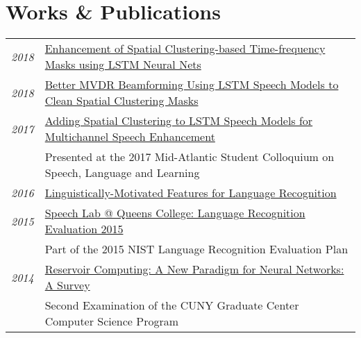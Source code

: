 \documentclass[a4paper,10pt]{article}
\begin{document}
\section{Works \& Publications}
    \vspace{0.2cm}
    \begin{tabular}{rp{14cm}}
        \hspace{2.5cm}\emph{2018} & \href{https://grezesf.github.io/papers/2018_ICASSP18__Enhancement_of_Spatial_Clustering_Based_Time_Frequency_Masks_using_LSTM_Neural_Networks.pdf}{Enhancement of Spatial Clustering-based Time-frequency Masks using LSTM Neural Nets}
        \vspace{0.15cm} \\

        \emph{2018} & \href{https://grezesf.github.io/papers/2018_IS18_Improved_MVDR_Beamforming_Using_LSTM_Speech_Models_to_Clean_Spatial_Clustering_Masks.pdf}{Better MVDR Beamforming Using LSTM Speech Models to Clean Spatial Clustering Masks}
        \vspace{0.15cm} \\

        \emph{2017} & \href{https://grezesf.github.io/papers/2017_IS17_Combining_Spatial_Clustering_with_LSTM_Speech_Models_for_Multichannel_Speech_Enhancement.pdf}{Adding Spatial Clustering to LSTM Speech Models for Multichannel Speech Enhancement}\\
        & \small{Presented at the 2017 Mid-Atlantic Student Colloquium on Speech, Language and Learning}
        \vspace{0.15cm} \\

        \emph{2016} & \href{https://grezesf.github.io/papers/2015_LRE15_linguistically-motivated-features.pdf}{Linguistically-Motivated Features for Language Recognition}
        \vspace{0.15cm} \\

        \emph{2015} & \href{https://grezesf.github.io/papers/2015_LRE15.pdf}{Speech Lab @ Queens College: Language Recognition Evaluation 2015} \\
        & \small{Part of the 2015 NIST Language Recognition Evaluation Plan}
        \vspace{0.15cm} \\

        \emph{2014} & \href{https://grezesf.github.io/papers/2014_09_04_Second_Exam_Survey_Felix_Grezes.pdf}{Reservoir Computing: A New Paradigm for Neural Networks: A Survey}\\
        & \small{Second Examination of the CUNY Graduate Center Computer Science Program}
        \vspace{0.15cm} \\


\end{tabular}
\end{document}
